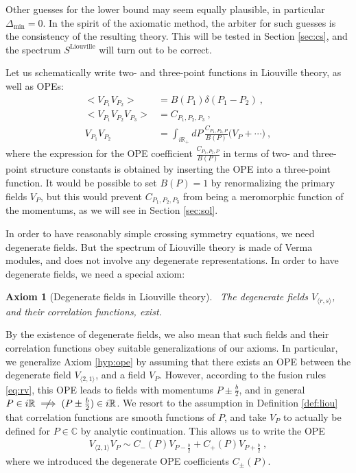 \documentclass[12pt, a4paper]{article}
\theoremstyle{break}
\newtheorem{hyp}[exo]{Axiom}
\begin{document}
Other guesses for the lower bound may seem equally plausible, in particular $\Delta_\text{min}=0$. In the spirit of the axiomatic method, the arbiter for such guesses is the consistency of the resulting theory. 
This will be tested in Section \ref{sec:cs}, and the spectrum $S^\mathrm{Liouville}$ will turn out to be correct.

Let us schematically write two- and three-point functions in Liouville theory, as well as OPEs:
\begin{align}
 \Big< V_{P_1}V_{P_2} \Big>  &=  B(P_1)\delta(P_1-P_2)\ ,
 \label{eq:vv}
 \\
 \Big< V_{P_1}V_{P_2}V_{P_3} \Big> & = C_{P_1,P_2,P_3} \ ,
 \label{eq:vvv}
 \\
 V_{P_1}V_{P_2} &= \int_{i\mathbb{R}_+} dP\, \frac{C_{P_1,P_2,P}}{B(P)} \Big( V_P + \cdots\Big)\ ,
 \label{eq:v1v2}
\end{align}
where the expression for the OPE coefficient $\frac{C_{P_1,P_2,P}}{B(P)}$ in terms of two- and three-point structure constants is obtained by inserting the OPE into a three-point function. 
It would be possible to set $B(P)=1$ by renormalizing the primary fields $V_{P}$, but this would prevent $C_{P_1,P_2,P_3}$ from being a meromorphic function of the momentums, as we will see in Section \ref{sec:sol}.

In order to have reasonably simple crossing symmetry equations, we need degenerate fields. 
But the spectrum of Liouville theory is made of Verma modules, and does not involve any degenerate representations.
In order to have degenerate fields, we need a special axiom:

\begin{hyp}[Degenerate fields in Liouville theory]
 ~\label{hyp:degl}
 The degenerate fields $V_{\langle r, s\rangle}$, and their correlation functions, exist. 
\end{hyp}
By the existence of degenerate fields, we also mean that such fields and their correlation functions obey suitable generalizations of our axioms. 
In particular, we generalize Axiom \ref{hyp:ope} by assuming that there exists an OPE between the degenerate field $V_{\langle 2, 1\rangle}$, and a field $V_P$. 
However, according to the fusion rules \eqref{eq:rv}, this OPE leads to fields with momentums $P\pm \frac{b}{2}$, and in general
$P \in i\mathbb{R} \centernot\implies (P\pm\frac{b}{2}) \in i\mathbb{R}$.
We resort to the assumption in Definition \ref{def:liou} that correlation functions are smooth functions of $P$, and take $V_P$ to actually be defined for $P\in\mathbb{C}$ by analytic continuation. This allows us to write the OPE
\begin{align}
 V_{\langle 2, 1\rangle} V_P \sim C_-(P) V_{P-\frac{b}{2}} + C_+(P)V_{P +\frac{b}{2}}\ ,
 \label{degope}
\end{align}
where we introduced the degenerate OPE coefficients $C_\pm(P)$.
\end{document}
